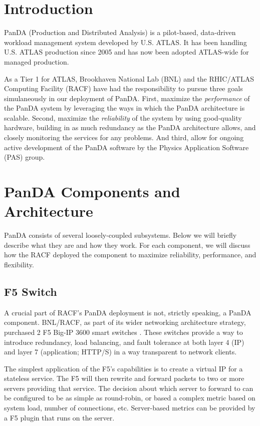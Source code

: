 \documentclass[letterpaper]{jpconf}
\begin{document}
\section{Introduction}

PanDA (Production and Distributed Analysis) is a pilot-based, data-driven
workload management system developed by U.S. ATLAS. It has been handling U.S.
ATLAS production since 2005 and has now been adopted ATLAS-wide for managed
production.\cite{pandasite} 

As a Tier 1 for ATLAS, Brookhaven National Lab (BNL) and the RHIC/ATLAS
Computing Facility (RACF) have had the responsibility to pursue three
goals simulaneously in our deployment of PanDA. First, maximize the
{\it performance} of the PanDA system by leveraging the ways in which the PanDA
architecture is scalable. Second, maximize the {\it reliability} of the system
by using good-quality hardware, building in as much redundancy as the PanDA architecture allows, and 
closely monitoring the services for any problems. And third, allow for ongoing
active development of the PanDA software by the Physics Application Software (PAS) group. 

\section{PanDA Components and Architecture}

PanDA consists of several loosely-coupled subsystems. Below we will briefly
describe what they are and how they work. For each component, we will discuss
how the RACF deployed the component to maximize reliability, performance, and
flexibility. 

\subsection{F5 Switch}

A crucial part of RACF's PanDA deployment is not, strictly speaking, a PanDA
component. BNL/RACF, as part of its wider networking architecture strategy,
purchased 2 F5 Big-IP 3600 smart switches \cite{f5site}. These switches provide
a way to introduce redundancy, load balancing, and fault tolerance at both layer 4 (IP) and layer
7 (application; HTTP/S) in a way transparent to network clients. 

The simplest application of the F5's capabilities is to create a virtual IP for
a stateless service. The F5 will then rewrite and forward packets to two or more
servers providing that service. The decision about which server to forward to
can be configured to be as simple as round-robin, or based a complex metric
based on system load, number of connections, etc. Server-based metrics can be
provided by a F5 plugin that runs on the server. 
\end{document}
